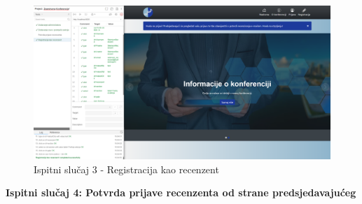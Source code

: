 			    \begin{figure}[H]
			 	\includegraphics[width= 15 cm, height= 25 cm, keepaspectratio]{slike/test_registracija_kao_recenzent.png} 
			 	\centering
			 	\caption{Ispitni slučaj 3 - Registracija kao recenzent}
			 	\label{fig:act5}
			 \end{figure}
			
			
			 \noindent \textbf{Ispitni slučaj 4: Potvrda prijave recenzenta od strane predsjedavajućeg}\\

